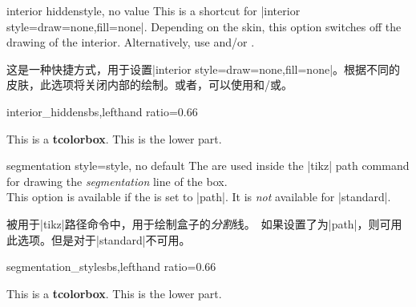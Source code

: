 \begin{docTcbKey}{interior hidden}{}{style, no value}
This is a shortcut for |interior style={draw=none,fill=none}|.
Depending on the skin, this option switches off the drawing of the
interior.
Alternatively, use  and/or .

这是一种快捷方式，用于设置|interior style={draw=none,fill=none}|。根据不同的皮肤，此选项将关闭内部的绘制。或者，可以使用和/或。
\begin{exdispExample*}{interior_hidden}{sbs,lefthand ratio=0.66}

\begin{tcolorbox}[enhanced,title=My title,
interior hidden]
This is a \textbf{tcolorbox}.
\tcblower
This is the lower part.
\end{tcolorbox}
\end{exdispExample*}
\end{docTcbKey}

\begin{docTcbKey}{segmentation style}{=}{style, no default}
The  are used inside the |tikz| path command
for drawing the \emph{segmentation} line of the box.\\
This option is available if the 
is set to |path|.
It is \emph{not} available for |standard|.

被用于|tikz|路径命令中，用于绘制盒子的\emph{分割}线。\ 如果设置了为|path|，则可用此选项。但是对于|standard|不可用。
\begin{exdispExample*}{segmentation_style}{sbs,lefthand ratio=0.66}

\begin{tcolorbox}[enhanced,title=My title,
segmentation style={double=white,draw=blue,
                double distance=1pt,solid}]
This is a \textbf{tcolorbox}.
\tcblower
This is the lower part.
\end{tcolorbox}
\end{exdispExample*}
\end{docTcbKey}

